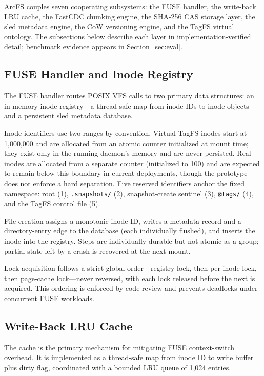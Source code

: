 \documentclass[5p,times]{elsarticle}
\begin{document}
ArcFS couples seven cooperating subsystems: the FUSE handler, the
write-back LRU cache, the FastCDC chunking engine, the SHA-256 CAS
storage layer, the sled metadata engine, the CoW versioning engine,
and the TagFS virtual ontology. The subsections below describe each
layer in implementation-verified detail; benchmark evidence appears
in Section~\ref{sec:eval}.

\subsection{FUSE Handler and Inode Registry}

The FUSE handler routes POSIX VFS calls to two primary data structures:
an in-memory inode registry---a thread-safe map from inode IDs to inode
objects---and a persistent sled metadata database.

Inode identifiers use two ranges by convention.  Virtual TagFS inodes
start at 1,000,000 and are allocated from an atomic counter initialized
at mount time; they exist only in the running daemon's memory and are
never persisted.  Real inodes
are allocated from a separate counter (initialized to 100) and are
expected to remain below this boundary in current deployments, though
the prototype does not enforce a hard separation.
Five reserved identifiers anchor the fixed namespace:
root (1), \texttt{.snapshots/} (2), snapshot-create sentinel (3),
\texttt{@tags/} (4), and the TagFS control file (5).

File creation assigns a monotonic inode ID, writes a metadata record and
a directory-entry edge to the database (each individually flushed), and
inserts the inode into the registry.  Steps are individually durable but
not atomic as a group; partial state left by a crash is recovered at the
next mount.

Lock acquisition follows a strict global order---registry lock, then
per-inode lock, then page-cache lock---never reversed, with each lock
released before the next is acquired.  This ordering is enforced by code
review and prevents deadlocks under concurrent FUSE workloads.

\subsection{Write-Back LRU Cache}
\label{sec:cache}

The cache is the primary mechanism for mitigating FUSE context-switch
overhead.  It is implemented as a thread-safe map from inode ID to write
buffer plus dirty flag, coordinated with a bounded LRU queue of 1,024
entries.
\end{document}
